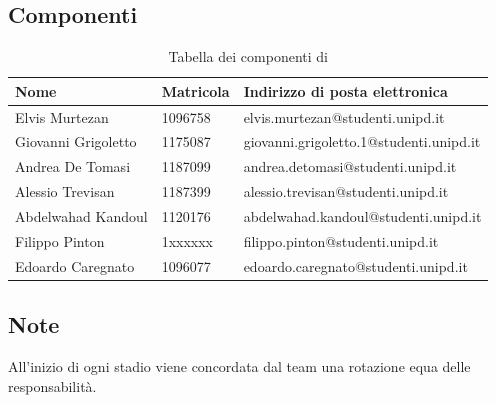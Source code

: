 \subsection{Componenti}
{
    \renewcommand{\arraystretch}{2}
	\begin{longtable}{ C{4cm} C{2cm} C{8cm} }
		\caption{Tabella dei componenti di \Gruppo{}}\\
		\rowcolor{\primaryColor}
        \textcolor{\secondaryColor}{\textbf{Nome}} & \textcolor{\secondaryColor}{\textbf{Matricola}} & \textcolor{\secondaryColor}{\textbf{Indirizzo di posta elettronica}}\\\endhead	
        {Elvis Murtezan} & 1096758 & {elvis.murtezan@studenti.unipd.it}\\   
        {Giovanni Grigoletto} & 1175087 & {giovanni.grigoletto.1@studenti.unipd.it}\\    
        {Andrea De Tomasi} & 1187099 & {andrea.detomasi@studenti.unipd.it}\\    
        {Alessio Trevisan} & 1187399 & {alessio.trevisan@studenti.unipd.it}\\    
        {Abdelwahad Kandoul} & 1120176 & {abdelwahad.kandoul@studenti.unipd.it} \\    
        {Filippo Pinton} & 1xxxxxx & {filippo.pinton@studenti.unipd.it}\\    
        {Edoardo Caregnato} & 1096077 & {edoardo.caregnato@studenti.unipd.it}\\       
	\end{longtable}
}
\subsection{Note}
All'inizio di ogni stadio viene concordata dal team una rotazione equa delle responsabilità.